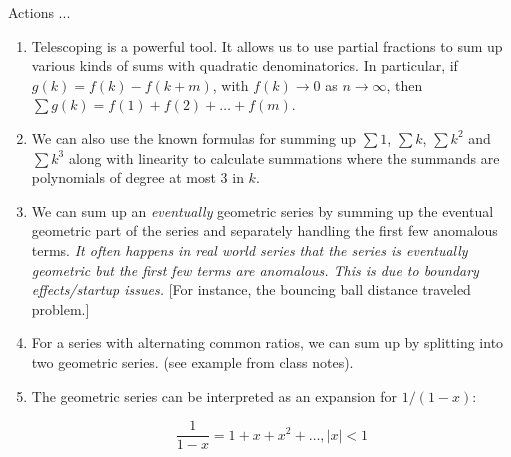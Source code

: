 \documentclass{amsart}
\begin{document}
Actions ...

\begin{enumerate}
\item Telescoping is a powerful tool. It allows us to use partial
  fractions to sum up various kinds of sums with quadratic
  denominatorics. In particular, if $g(k) = f(k) - f(k + m)$, with
  $f(k) \to 0$ as $n \to \infty$, then $\sum g(k) = f(1) + f(2) +
  \dots + f(m)$.
\item We can also use the known formulas for summing up $\sum 1$,
  $\sum k$, $\sum k^2$ and $\sum k^3$ along with linearity to
  calculate summations where the summands are polynomials of degree at
  most $3$ in $k$.
\item We can sum up an {\em eventually} geometric series by summing up
  the eventual geometric part of the series and separately handling
  the first few anomalous terms. {\em It often happens in real world
  series that the series is eventually geometric but the first few
  terms are anomalous. This is due to boundary effects/startup
  issues.} [For instance, the bouncing ball distance traveled problem.]
\item For a series with alternating common ratios, we can sum up by
  splitting into two geometric series. (see example from class notes).
\item The geometric series can be interpreted as an expansion for $1/(1 - x)$:

  $$\frac{1}{1 - x} = 1 + x + x^2 + \dots, |x| < 1$$


\end{enumerate}
\end{document}
